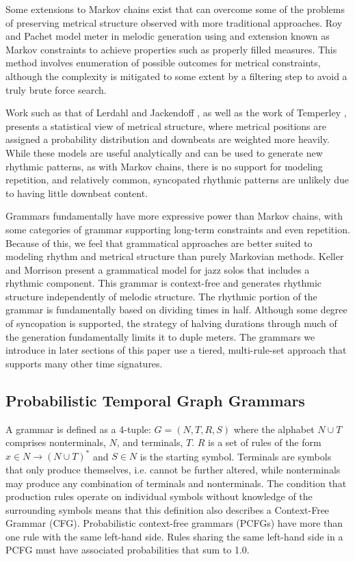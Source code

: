 \documentclass{article}
\begin{document}
Some extensions to Markov chains exist that can overcome some of the problems of preserving metrical structure observed with more traditional approaches. Roy and Pachet model meter in melodic generation \cite{roy2013} using and extension known as Markov constraints \cite{pachet2011} to achieve properties such as properly filled measures. This method involves enumeration of possible outcomes for metrical constraints, although the complexity is mitigated to some extent by a filtering step to avoid a truly brute force search.

Work such as that of Lerdahl and Jackendoff \cite{gttm}, as well as the work of Temperley \cite{temperley2010}, presents a statistical view of metrical structure, where metrical positions are assigned a probability distribution and downbeats are weighted more heavily. While these models are useful analytically and can be used to generate new rhythmic patterns, as with Markov chains, there is no support for modeling repetition, and relatively common, syncopated rhythmic patterns are unlikely due to having little downbeat content. 

Grammars fundamentally have more expressive power \linebreak than Markov chains, with some categories of grammar supporting long-term constraints and even repetition. Because of this, we feel that grammatical approaches are better suited to modeling rhythm and metrical structure than purely Markovian methods.
Keller and Morrison present a grammatical model for jazz solos that includes a rhythmic component. This grammar is context-free and generates rhythmic structure independently of melodic structure. The rhythmic portion of the grammar is fundamentally based on dividing times in half. Although some degree of syncopation is supported, the strategy of halving durations through much of the generation fundamentally limits it to duple meters. The grammars we introduce in later sections of this paper use a tiered, multi-rule-set approach that supports many other time signatures. 

\subsection{Probabilistic Temporal Graph Grammars}

A grammar is defined as a 4-tuple: $G = (N,T,R,S)$ where the alphabet $N \cup T$ comprises nonterminals, $N$, and terminals, $T$. $R$ is a set of rules of the form $x \in N \rightarrow (N \cup T)^{*}$ and $S \in N$ is the starting symbol. Terminals are symbols that only produce themselves, i.e. cannot be further altered, while nonterminals may produce any combination of terminals and nonterminals. The condition that production rules operate on individual symbols without knowledge of the surrounding symbols means that this definition also describes a Context-Free Grammar (CFG). Probabilistic context-free grammars (PCFGs) have more than one rule with the same left-hand side. Rules sharing the same left-hand side in a PCFG must have associated probabilities that sum to 1.0.
\end{document}
